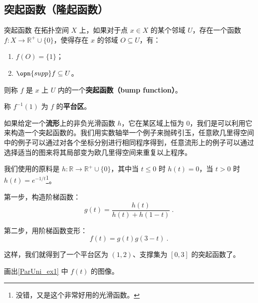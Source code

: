 \subsection{突起函数（隆起函数）}

\begin{definition}{突起函数}
在拓扑空间 $X$ 上，如果对于点 $x\in X$ 的某个邻域 $U$，存在一个函数 $f:X\to\mathbb{R}^+\cup\{0\}$，使得存在 $x$ 的邻域 $O\subseteq U$，有：
\begin{enumerate}
\item $f(O)=\{1\}$；
\item $\opn{supp} f \subseteq U$。
\end{enumerate}
则称 $f$ 是 $x$ 上 $U$ 内的一个\textbf{突起函数（bump function）}。

称 $f^{-1}(1)$ 为 $f$ 的\textbf{平台区}。
\end{definition}

如果给定一个\textbf{流形}上的非负光滑函数 $h$，它在某区域上恒为 $0$，我们是可以利用它来构造一个突起函数的。我们用实数轴举一个例子来抛砖引玉，任意欧几里得空间中的例子可以通过对各个坐标分别进行相同程序得到，任意流形上的例子可以通过选择适当的图来将其局部变为欧几里得空间来重复以上程序。

\begin{example}{}\label{ParUni_ex1}
我们使用的原料是 $h:\mathbb{R}\to\mathbb{R}^+\cup\{0\}$，其中当 $t\leq 0$ 时 $h(t)=0$，当 $t>0$ 时 $h(t)=e^{-1/t}$\footnote{没错，又是这个非常好用的光滑函数。}。

第一步，构造阶梯函数：
\begin{equation}
g(t)=\frac{h(t)}{h(t)+h(1-t)}~.
\end{equation}

第二步，用阶梯函数变形：
\begin{equation}
f(t)=g(t)g(3-t)~.
\end{equation}

这样，我们就得到了一个平台区为 $(1, 2)$、支撑集为 $[0, 3]$ 的突起函数了。
\end{example}

\begin{exercise}{}
画出\autoref{ParUni_ex1} 中 $f(t)$ 的图像。
\end{exercise}





